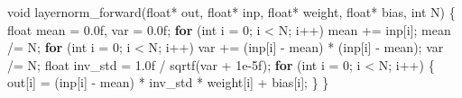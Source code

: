 \documentclass[
  letterpaper,
  DIV=11,
  numbers=noendperiod]{scrreprt}
\newenvironment{Shaded}{\begin{snugshade}}{\end{snugshade}}
\newcommand{\BuiltInTok}[1]{\textcolor[rgb]{0.00,0.23,0.31}{#1}}
\newcommand{\ControlFlowTok}[1]{\textcolor[rgb]{0.00,0.23,0.31}{\textbf{#1}}}
\newcommand{\DataTypeTok}[1]{\textcolor[rgb]{0.68,0.00,0.00}{#1}}
\newcommand{\DecValTok}[1]{\textcolor[rgb]{0.68,0.00,0.00}{#1}}
\newcommand{\FloatTok}[1]{\textcolor[rgb]{0.68,0.00,0.00}{#1}}
\newcommand{\NormalTok}[1]{\textcolor[rgb]{0.00,0.23,0.31}{#1}}
\newcommand{\OperatorTok}[1]{\textcolor[rgb]{0.37,0.37,0.37}{#1}}
\begin{document}
\begin{Shaded}
\begin{Highlighting}[]
\DataTypeTok{void}\NormalTok{ layernorm\_forward}\OperatorTok{(}\DataTypeTok{float}\OperatorTok{*}\NormalTok{ out}\OperatorTok{,} \DataTypeTok{float}\OperatorTok{*}\NormalTok{ inp}\OperatorTok{,} \DataTypeTok{float}\OperatorTok{*}\NormalTok{ weight}\OperatorTok{,} \DataTypeTok{float}\OperatorTok{*}\NormalTok{ bias}\OperatorTok{,} \DataTypeTok{int}\NormalTok{ N}\OperatorTok{)} \OperatorTok{\{}
    \DataTypeTok{float}\NormalTok{ mean }\OperatorTok{=} \FloatTok{0.0}\BuiltInTok{f}\OperatorTok{,}\NormalTok{ var }\OperatorTok{=} \FloatTok{0.0}\BuiltInTok{f}\OperatorTok{;}
    \ControlFlowTok{for} \OperatorTok{(}\DataTypeTok{int}\NormalTok{ i }\OperatorTok{=} \DecValTok{0}\OperatorTok{;}\NormalTok{ i }\OperatorTok{\textless{}}\NormalTok{ N}\OperatorTok{;}\NormalTok{ i}\OperatorTok{++)}\NormalTok{ mean }\OperatorTok{+=}\NormalTok{ inp}\OperatorTok{[}\NormalTok{i}\OperatorTok{];}
\NormalTok{    mean }\OperatorTok{/=}\NormalTok{ N}\OperatorTok{;}
    \ControlFlowTok{for} \OperatorTok{(}\DataTypeTok{int}\NormalTok{ i }\OperatorTok{=} \DecValTok{0}\OperatorTok{;}\NormalTok{ i }\OperatorTok{\textless{}}\NormalTok{ N}\OperatorTok{;}\NormalTok{ i}\OperatorTok{++)}\NormalTok{ var }\OperatorTok{+=} \OperatorTok{(}\NormalTok{inp}\OperatorTok{[}\NormalTok{i}\OperatorTok{]} \OperatorTok{{-}}\NormalTok{ mean}\OperatorTok{)} \OperatorTok{*} \OperatorTok{(}\NormalTok{inp}\OperatorTok{[}\NormalTok{i}\OperatorTok{]} \OperatorTok{{-}}\NormalTok{ mean}\OperatorTok{);}
\NormalTok{    var }\OperatorTok{/=}\NormalTok{ N}\OperatorTok{;}
    \DataTypeTok{float}\NormalTok{ inv\_std }\OperatorTok{=} \FloatTok{1.0}\BuiltInTok{f} \OperatorTok{/}\NormalTok{ sqrtf}\OperatorTok{(}\NormalTok{var }\OperatorTok{+} \FloatTok{1e{-}5}\BuiltInTok{f}\OperatorTok{);}
    \ControlFlowTok{for} \OperatorTok{(}\DataTypeTok{int}\NormalTok{ i }\OperatorTok{=} \DecValTok{0}\OperatorTok{;}\NormalTok{ i }\OperatorTok{\textless{}}\NormalTok{ N}\OperatorTok{;}\NormalTok{ i}\OperatorTok{++)} \OperatorTok{\{}
\NormalTok{        out}\OperatorTok{[}\NormalTok{i}\OperatorTok{]} \OperatorTok{=} \OperatorTok{(}\NormalTok{inp}\OperatorTok{[}\NormalTok{i}\OperatorTok{]} \OperatorTok{{-}}\NormalTok{ mean}\OperatorTok{)} \OperatorTok{*}\NormalTok{ inv\_std }\OperatorTok{*}\NormalTok{ weight}\OperatorTok{[}\NormalTok{i}\OperatorTok{]} \OperatorTok{+}\NormalTok{ bias}\OperatorTok{[}\NormalTok{i}\OperatorTok{];}
    \OperatorTok{\}}
\OperatorTok{\}}
\end{Highlighting}
\end{Shaded}
\end{document}
